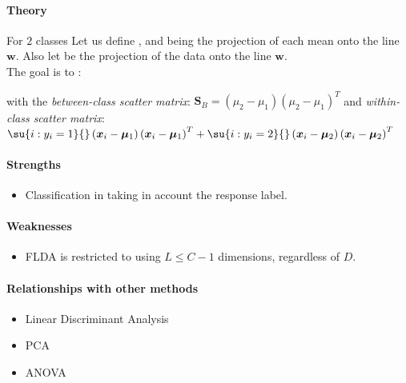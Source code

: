 \paragraph{Theory}
For $2$ classes
Let us define 
,
and  being the projection of each mean onto the line
$\bm{w}$. Also let  be the projection of the data onto the 
line $\bm{w}$.\\
The goal is to :
\begin{center}
\end{center}
with the \emph{between-class scatter matrix}: $\bm{S}_{B} = \left(\mu_{2} - \mu_{1}
\right)\left(\mu_{2} - \mu_{1}\right)^{T}$ and \emph{within-class scatter matrix}:
$
\su{i:y_{i}=1}{}\left(\bm{x}_{i} - \bm{\mu}_{1}\right) \left(\bm{x}_{i} - 
\bm{\mu}_{1}\right)^{T} + \su{i:y_{i}=2}{}\left(\bm{x}_{i} - \bm{\mu}_{2}\right)\left(
\bm{x}_{i} - \bm{\mu}_{2}\right)^{T}
$


\paragraph{Strengths}
\begin{itemize}
    \item Classification in taking in account the response label.
\end{itemize}

\paragraph{Weaknesses}
\begin{itemize}
    \item FLDA is restricted to using $L\leq C-1$ dimensions, regardless of $D$.
\end{itemize}

\paragraph{Relationships with other methods}
\begin{itemize}
    \item Linear Discriminant Analysis
    \item PCA
    \item ANOVA
\end{itemize}

